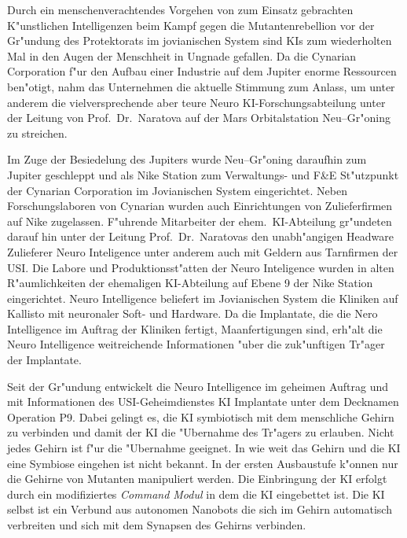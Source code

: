 

Durch ein menschenverachtendes Vorgehen von zum Einsatz gebrachten K"unstlichen Intelligenzen beim Kampf gegen die Mutantenrebellion vor der Gr"undung des Protektorats im jovianischen System sind KIs zum wiederholten Mal in den Augen der Menschheit in Ungnade gefallen. Da die Cynarian Corporation f"ur den Aufbau einer Industrie auf dem Jupiter enorme Ressourcen ben"otigt, nahm das Unternehmen die aktuelle Stimmung zum Anlass, um unter anderem die vielversprechende aber teure Neuro KI-Forschungsabteilung unter der Leitung von Prof.~Dr.~Naratova auf der Mars Orbitalstation Neu--Gr"oning zu streichen.

Im Zuge der Besiedelung des Jupiters wurde Neu--Gr"oning daraufhin zum Jupiter geschleppt und als Nike Station zum Verwaltungs- und F\&E St"utzpunkt der Cynarian Corporation im Jovianischen System eingerichtet. Neben Forschungslaboren von Cynarian wurden auch Einrichtungen von Zulieferfirmen auf Nike zugelassen. F"uhrende Mitarbeiter der ehem.~KI-Abteilung gr"undeten darauf hin unter der Leitung Prof.~Dr.~Naratovas den unabh"angigen Headware Zulieferer Neuro Inteligence unter anderem auch mit Geldern aus Tarnfirmen der USI. Die Labore und Produktionsst"atten der Neuro Inteligence wurden in alten R"aumlichkeiten der ehemaligen KI-Abteilung auf Ebene 9 der Nike Station eingerichtet. Neuro Intelligence beliefert im Jovianischen System die Kliniken auf Kallisto mit neuronaler Soft- und Hardware. Da die Implantate, die die Nero Intelligence im Auftrag der Kliniken fertigt, Ma\3anfertigungen sind, erh"alt die Neuro Intelligence weitreichende Informationen "uber die zuk"unftigen Tr"ager der Implantate.

Seit der Gr"undung entwickelt die Neuro Intelligence im geheimen Auftrag und mit Informationen des USI-Geheimdienstes KI Implantate unter dem Decknamen Operation P9. Dabei gelingt es, die KI symbiotisch mit dem menschliche Gehirn zu verbinden und damit der KI die "Ubernahme des Tr"agers zu erlauben. Nicht jedes Gehirn ist f"ur die "Ubernahme geeignet. In wie weit das Gehirn und die KI eine Symbiose eingehen ist nicht bekannt. In der ersten Ausbaustufe k"onnen nur die Gehirne von Mutanten manipuliert werden. Die Einbringung der KI erfolgt durch ein modifiziertes \emph{Command Modul} in dem die KI eingebettet ist. Die KI selbst ist ein Verbund aus autonomen Nanobots die sich im Gehirn automatisch verbreiten und sich mit dem Synapsen des Gehirns verbinden.

